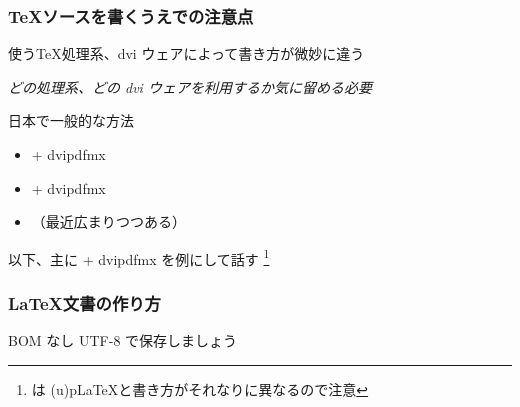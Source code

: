 \begin{frame}
	\frametitle{\TeX ソースを書くうえでの注意点}
	使う\TeX 処理系、dvi ウェアによって書き方が微妙に違う
	
	\emph{どの処理系、どの dvi ウェアを利用するか気に留める必要}
	
	\pause
	\begin{block}{日本で一般的な方法}
		\begin{itemize}
			\item {\pLaTeX} + dvipdfmx
			\item {\upLaTeX} + dvipdfmx
			\item {\LuaLaTeX}（最近広まりつつある）
		\end{itemize}
	\end{block}
	
	以下、主に {\pLaTeX} + dvipdfmx を例にして話す
	\footnote{\LuaLaTeX は (u)p\LaTeX と書き方がそれなりに異なるので注意}
\end{frame}


\begin{frame}[fragile]
	\frametitle{\LaTeX 文書の作り方}
	
	
	BOM なし UTF-8 で保存しましょう
\end{frame}

